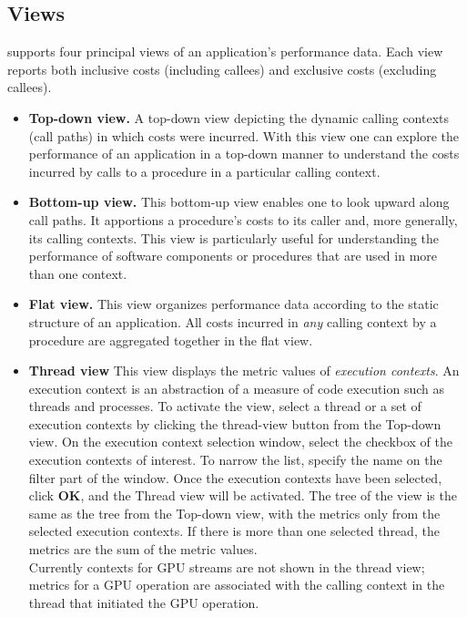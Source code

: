 \documentclass[english]{article}
\begin{document}
\subsection{Views}

 supports four principal views of an application's performance data.
Each view reports both inclusive costs (including callees) and exclusive costs (excluding callees).

\begin{itemize}

\item \textbf{Top-down view.}
A top-down view depicting the dynamic calling contexts (call paths) in which costs were incurred.
With this view one can explore the performance of an application in a top-down manner
to understand the costs incurred by calls to a procedure in a particular calling context.

\item \textbf{Bottom-up view.}
This bottom-up view enables one to look upward along call paths.
It apportions a procedure's costs to its caller and, more generally,
its calling contexts.
This view is particularly useful for understanding the performance of software components or procedures
that are used in more than one context.

\item \textbf{Flat view.}
This view organizes performance data according to the static structure of an application.
All costs incurred in \emph{any} calling context by a procedure are aggregated together in the flat view.

\item \textbf{Thread view}
	This view displays the metric values of \emph{execution contexts}.
An execution context is an abstraction of a measure of code execution such as threads and processes.
To activate the view, select a thread or a set of execution contexts by clicking the thread-view button from the Top-down view.
On the execution context selection window, select the checkbox of the execution contexts of interest.
To  narrow the list, specify the name on the filter part of the window.
Once the execution contexts have been selected, click \textbf{OK}, and the Thread view will be activated.
The tree of the view is the same as the tree from the Top-down view, with the metrics only from the selected execution contexts.
If there is more than one selected thread, the metrics are the sum of the metric values.
\\
Currently contexts for GPU streams are not shown in the thread view; metrics for a GPU operation are associated with the calling context in the thread that initiated the GPU operation.


\end{itemize}
\end{document}
